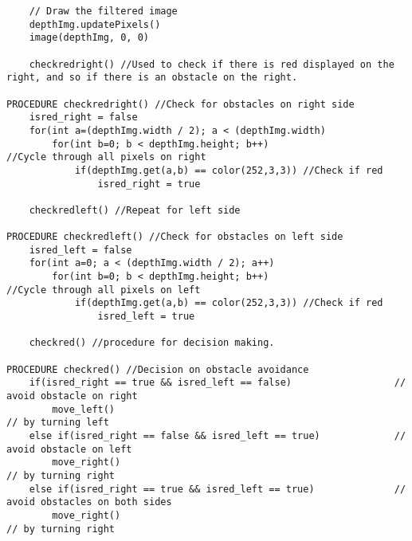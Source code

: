 \documentclass[11pt]{report}
\begin{document}
\begin{lstlisting}
	// Draw the filtered image
	depthImg.updatePixels()
	image(depthImg, 0, 0)
	
	checkredright() //Used to check if there is red displayed on the right, and so if there is an obstacle on the right.
	
PROCEDURE checkredright() //Check for obstacles on right side
	isred_right = false
	for(int a=(depthImg.width / 2); a < (depthImg.width)
		for(int b=0; b < depthImg.height; b++) 					//Cycle through all pixels on right
			if(depthImg.get(a,b) == color(252,3,3)) //Check if red
				isred_right = true
  
	checkredleft() //Repeat for left side
	
PROCEDURE checkredleft() //Check for obstacles on left side
	isred_left = false
	for(int a=0; a < (depthImg.width / 2); a++)
		for(int b=0; b < depthImg.height; b++) 					//Cycle through all pixels on left
			if(depthImg.get(a,b) == color(252,3,3)) //Check if red
				isred_left = true
				
	checkred() //procedure for decision making.
	
PROCEDURE checkred() //Decision on obstacle avoidance
	if(isred_right == true && isred_left == false) 					// avoid obstacle on right
		move_left()																	// by turning left
	else if(isred_right == false && isred_left == true)				// avoid obstacle on left
		move_right()																// by turning right
	else if(isred_right == true && isred_left == true)				// avoid obstacles on both sides
		move_right()																// by turning right
	
\end{lstlisting}
\end{document}

